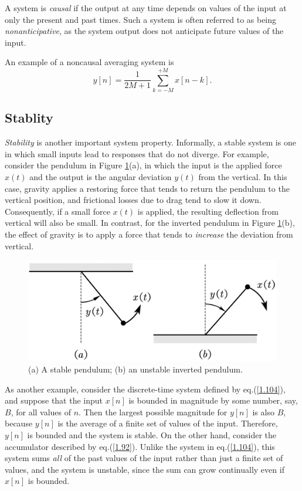 \documentclass[a4paper,10pt,twoside]{book}
\begin{document}
A system is \textit{causal} if the output at any time depends on values of the input at only the present and past times. Such a system is often referred to as being \textit{nonanticipative}, as the system output does not anticipate future values of the input.

An example of a noncausal averaging system is
\begin{equation}
    y[n] = \frac{1}{2M+1} \sum_{k = -M}^{+M}x[n-k].
    \label{1.104}
\end{equation}

\subsection{Stablity}
\label{section:1.6.4}

\textit{Stability} is another important system property. Informally, a stable system is one in which small inputs lead to responses that do not diverge. For example, consider the pendulum in Figure \ref{Fig4}(a), in which the input is the applied force $x(t)$ and the output is the angular deviation $y(t)$ from the vertical. In this case, gravity applies a restoring force that tends to return the pendulum to the vertical position, and frictional losses due to drag tend to slow it down. Consequently, if a small force $x(t)$ is applied, the resulting deflection from vertical will also be small. In contrast, for the inverted pendulum in Figure \ref{Fig4}(b), the effect of gravity is to apply a force that tends to \textit{increase} the deviation from vertical.

\begin{figure}[htbp]
    \centering
    \includegraphics[width=0.35\linewidth]{Fig4.png}
    \caption{(a) A stable pendulum; (b) an unstable inverted pendulum.}
    \label{Fig4}
\end{figure}

As another example, consider the discrete-time system defined by eq.\;(\ref{1.104}), and suppose that the input $x[n]$ is bounded in magnitude by some number, say, $B$, for all values of $n$. Then the largest possible magnitude for $y[n]$ is also $B$, because $y[n]$ is the average of a finite set of values of the input. Therefore, $y[n]$ is bounded and the system is stable. On the other hand, consider the accumulator described by eq.\;(\ref{1.92}). Unlike the system in eq.\;(\ref{1.104}), this system sums \textit{all} of the past values of the input rather than just a finite set of values, and the system is unstable, since the sum can grow continually even if $x[n]$ is bounded.
\end{document}

